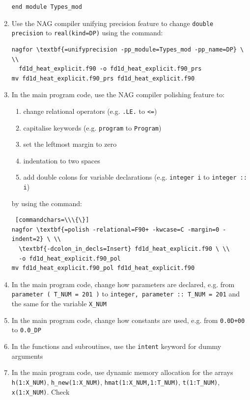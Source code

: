 \documentclass[12pt]{article}
\begin{document}
\begin{enumerate}
\begin{verbatim}
end module Types_mod
\end{verbatim} \label{mod:temp}
\item Use the NAG compiler unifying precision feature to change \texttt{double precision} to \texttt{real(kind=DP)}
using the command:
\begin{Verbatim}[commandchars=\\\{\}]
nagfor \textbf{=unifyprecision -pp_module=Types_mod -pp_name=DP} \ \\
  fd1d_heat_explicit.f90 -o fd1d_heat_explicit.f90_prs
mv fd1d_heat_explicit.f90_prs fd1d_heat_explicit.f90
\end{Verbatim}
\item In the main program code, use the NAG compiler polishing feature to:
\begin{enumerate}
\item change relational operators (e.g. \texttt{.LE.} to \texttt{<=})
\item capitalise keywords (e.g. \texttt{program} to \texttt{Program})
\item set the leftmost margin to zero
\item indentation to two spaces
\item add double colons for variable declarations (e.g. \texttt{integer i} to \texttt{integer :: i})
\end{enumerate}
by using the command:
\begin{Verbatim} [commandchars=\\\{\}]
nagfor \textbf{=polish -relational=F90+ -kwcase=C -margin=0 -indent=2} \ \\
  \textbf{-dcolon_in_decls=Insert} fd1d_heat_explicit.f90 \ \\
  -o fd1d_heat_explicit.f90_pol
mv fd1d_heat_explicit.f90_pol fd1d_heat_explicit.f90
\end{Verbatim}
\item In the main program code, change how parameters are declared, e.g. from 
\texttt{parameter ( T\_NUM = 201 )} to \texttt{integer, parameter :: T\_NUM = 201} and the
same for the variable \texttt{X\_NUM}
\item In the main program code, change how constants are used, e.g. from \texttt{0.0D+00} to 
\texttt{0.0\_DP}
\item In the functions and subroutines, use the \texttt{intent} keyword for dummy arguments
\item In the main program code, use dynamic memory allocation for the arrays \texttt{h(1:X\_NUM)}, 
\texttt{h\_new(1:X\_NUM)}, \texttt{hmat(1:X\_NUM,1:T\_NUM)}, \texttt{t(1:T\_NUM)}, \texttt{x(1:X\_NUM)}. Check

\end{enumerate}
\end{document}
